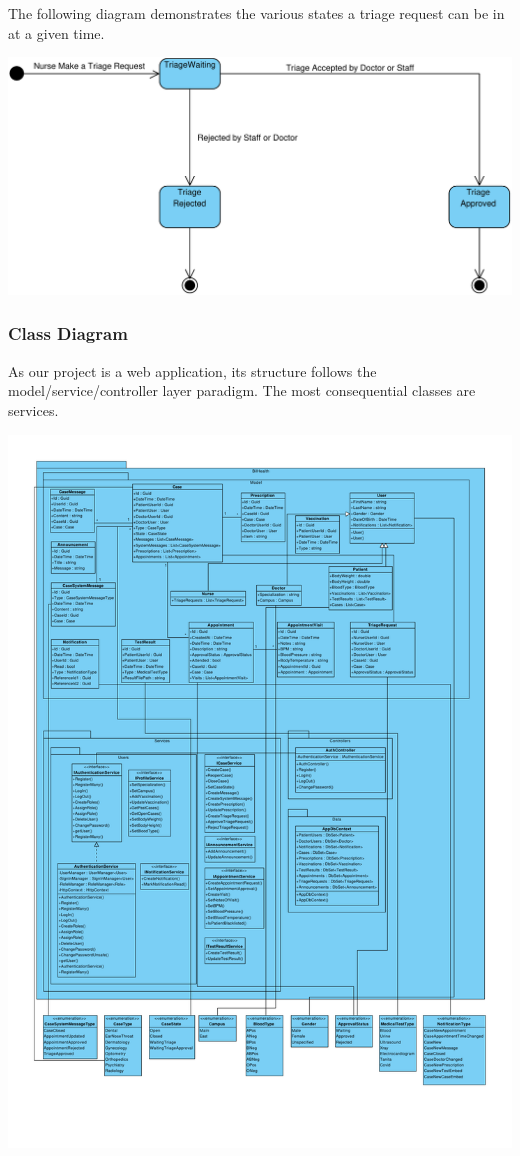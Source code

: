 \documentclass[a4paper, 12pt, titlepage]{article}
\begin{document}
  \pagebreak
  The following diagram demonstrates the various states a triage request can be in at a given time.

  \includegraphics[width=\linewidth]{state_diag_triage}

  \pagebreak
  \subsubsection{Class Diagram}

  As our project is a web application, its structure follows the model/service/controller layer paradigm.
  The most consequential classes are services.

  \includegraphics[width=\linewidth]{class_diag}
\end{document}
